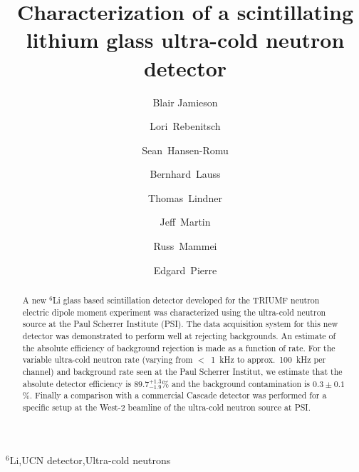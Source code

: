 \documentclass[letter,twocolumn,preprint,3p,numbers,sort&compress]{elsarticle}
\begin{document}
\begin{frontmatter}

\title{Characterization of a scintillating lithium glass ultra-cold neutron detector }



\author[aWpg]{Blair Jamieson}
\author[aWpg]{Lori~Rebenitsch}
\author[aWpg]{Sean~Hansen-Romu}
\author[aPSI]{Bernhard~Lauss}
\author[aTRIUMF,aWpg]{Thomas~Lindner}
\author[aWpg]{Jeff~Martin}
\author[aWpg]{Russ~Mammei}
\author[aRCNP,aTRIUMF]{Edgard~Pierre}



\address[aWpg]{Department of Physics, University of Winnipeg, 515
  Portage Avenue, Winnipeg, MB, Canada.}

\address[aPSI]{Laboratory for Particle Physics, Paul Scherrer
  Institute, CH5232 Villigen PSI, Switzerland.}

\address[aTRIUMF]{TRIUMF, 4004 Wesbrook Mall, Vancouver, BC, Canada. } 

\address[aRCNP]{Research Centre for Nuclear Physics, Osaka University,
  Osaka, Japan.}



\begin{abstract}

A new $^{6}$Li glass based scintillation detector developed for the
TRIUMF neutron electric dipole moment experiment was characterized
using the ultra-cold neutron source at the Paul Scherrer Institute
(PSI).  The data acquisition system for this new detector was
demonstrated to perform well at rejecting backgrounds. An estimate of
the absolute efficiency of background rejection is made as a function
of rate.  For the variable ultra-cold neutron rate (varying from
$<$~1~kHz to approx.\ 100~kHz per channel) and background rate seen at
the Paul Scherrer Institut, we estimate that the absolute detector
efficiency is $89.7^{+1.3}_{-1.9}$\% and the background contamination
is $0.3\pm0.1$\%.  Finally a comparison with a commercial Cascade
detector was performed for a specific setup at the West-2 beamline of
the ultra-cold neutron source at PSI.

\end{abstract}

\begin{keyword}
$^6$Li\sep UCN detector\sep Ultra-cold neutrons 
\end{keyword}

\end{frontmatter}
\end{document}
